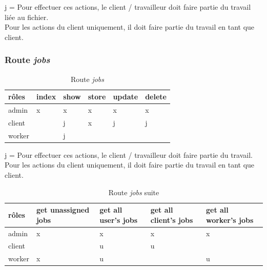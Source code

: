 \documentclass[
    iai, %
    il, %
]{heig-tb}
\begin{document}
j = Pour effectuer ces actions, le client / travailleur doit faire partie du travail liée au fichier. \\
Pour les actions du client uniquement, il doit faire partie du travail en tant que client.

\subsubsection{Route \emph{jobs}}


\begin{table}[h]
    \begin{center}
        \caption{Route \emph{jobs} \label{autorisations-route-jobs}}
        \begin{tabularx}{1.0\textwidth} {X|X|X|X|X|X}
            rôles  & index & show & store & update & delete \\ \hline
            admin  & x     & x    & x     & x      & x      \\
            client &       & j    & x     & j      & j      \\
            worker &       & j    &       &        &        \\
        \end{tabularx}
    \end{center}
\end{table}

j = Pour effectuer ces actions, le client / travailleur doit faire partie du travail. \\
Pour les actions du client uniquement, il doit faire partie du travail en tant que client.


\begin{table}[h]
    \begin{center}
        \caption{Route \emph{jobs} suite \label{autorisations-route-jobs-other-get}}
        \begin{tabularx}{1.0\textwidth} {X|X|X|X|X}
            rôles  & get unassigned jobs & get all user's jobs & get all client's jobs & get all worker's jobs \\ \hline
            admin  & x                   & x                   & x                     & x                     \\
            client &                     & u                   & u                     &                       \\
            worker & x                   & u                   &                       & u                     \\
        \end{tabularx}
    \end{center}
\end{table}
\end{document}
